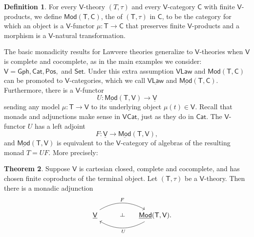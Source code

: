 \documentclass{amsart}
\newcommand{\define}[1]{{\bf \boldmath{#1}}}
\theoremstyle{definition}
\newtheorem{theorem}{Theorem}
\newtheorem{definition}[theorem]{Definition}
\def\ld{\rotatebox[origin=c]{-90}{$\dashv$}} %
\newcommand{\Gph}{\mathsf{Gph}}
\newcommand{\Set}{\mathsf{Set}}
\newcommand{\Cat}{\mathsf{Cat}}
\newcommand{\Law}{\mathsf{Law}}
\newcommand{\Pos}{\mathsf{Pos}}
\newcommand{\Mod}{\mathsf{Mod}}
\newcommand{\V}{\mathsf{V}}
\newcommand{\C}{\mathsf{C}}
\newcommand{\T}{\mathsf{T}}
\newcommand{\maps}{\colon}
\begin{document}
\begin{definition}
\label{defn:VMod}
For every $\V$-theory $(T,\tau)$ and every $\V$-category $\C$ with finite $\V$-products, we define $\Mod(\T,\C)$, the \define{category of models} of $(\T,\tau)$ in $\C$, to be the category for which an object is a $\V$-functor $\mu \maps \T\to \C$ that preserves finite $\V$-products and a morphism is a $\V$-natural transformation.
\end{definition}

The basic monadicity results for Lawvere theories generalize to $\V$-theories when $\V$ is  complete and cocomplete, as in the main examples we consider: $\V = \Gph, \Cat, \Pos,$ and $\Set$.   Under this extra assumption $\V\Law$ and  $\Mod(\T,\C)$ can be promoted to 
$\V$-categories, which we call $\underline{\V\Law}$ and $\underline{\Mod}(\T,\C)$.  Furthermore, there is a $\V$-functor 
\[   U \maps \underline{\Mod}(\T,\V) \to \underline{\V} \]
sending any model  $\mu \maps \T \to \V$ to its underlying object $\mu(t) \in \V$.   
Recall that monads and adjunctions make sense in $\V\Cat$, just as they do in $\Cat$.  
The $\V$-functor $U$ has a left adjoint
\[   F \maps \underline{\V} \to \underline{\Mod}(\T,\V) ,\]
and $\underline{\Mod}(\T,\V)$ is equivalent to the $\V$-category of algebras of the resulting monad $T = UF$.  More precisely:

\begin{theorem}
\label{thm:monadicity}
Suppose $\V$ is cartesian closed, complete and cocomplete, and has chosen finite coproducts of the terminal object.  Let $(\T,\tau)$ be a $\V$-theory.  Then there is a monadic adjunction
\[\begin{tikzcd}[column sep=small]
\phantom{AA} \underline{\V} \arrow[bend left,below]{rr}{F}
& {\phantom{Aa} \ld} &
\arrow[bend left,above]{ll}{\;\, U} \underline{\Mod}(\T,\V).
\end{tikzcd}\]
\end{theorem}
\end{document}
